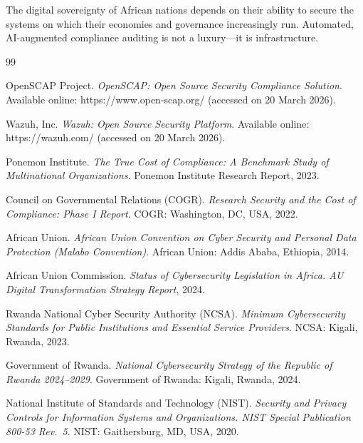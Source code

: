 \documentclass[12pt,oneside]{report}
\begin{document}
The digital sovereignty of African nations depends on their ability to secure the systems on which their economies and governance increasingly run. Automated, AI-augmented compliance auditing is not a luxury—it is infrastructure.

\newpage
{}
\renewcommand{\bibname}{REFERENCES}

\begin{thebibliography}{99}

OpenSCAP Project. \textit{OpenSCAP: Open Source Security Compliance Solution}. Available online: https://www.open-scap.org/ (accessed on 20 March 2026).

Wazuh, Inc. \textit{Wazuh: Open Source Security Platform}. Available online: https://wazuh.com/ (accessed on 20 March 2026).

Ponemon Institute. \textit{The True Cost of Compliance: A Benchmark Study of Multinational Organizations}. Ponemon Institute Research Report, 2023.

Council on Governmental Relations (COGR). \textit{Research Security and the Cost of Compliance: Phase I Report}. COGR: Washington, DC, USA, 2022.

African Union. \textit{African Union Convention on Cyber Security and Personal Data Protection (Malabo Convention)}. African Union: Addis Ababa, Ethiopia, 2014.

African Union Commission. \textit{Status of Cybersecurity Legislation in Africa. AU Digital Transformation Strategy Report}, 2024.

Rwanda National Cyber Security Authority (NCSA). \textit{Minimum Cybersecurity Standards for Public Institutions and Essential Service Providers}. NCSA: Kigali, Rwanda, 2023.

Government of Rwanda. \textit{National Cybersecurity Strategy of the Republic of Rwanda 2024--2029}. Government of Rwanda: Kigali, Rwanda, 2024.

National Institute of Standards and Technology (NIST). \textit{Security and Privacy Controls for Information Systems and Organizations. NIST Special Publication 800-53 Rev.\ 5}. NIST: Gaithersburg, MD, USA, 2020.


\end{thebibliography}
\end{document}
